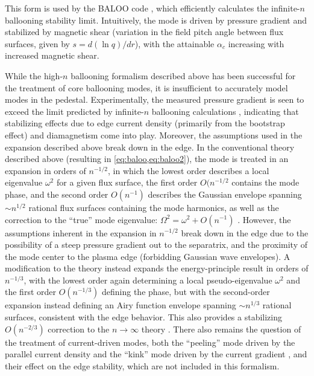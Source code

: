 \noindent This form is used by the BALOO code \cite{Connor1979,Miller1987,Miller1997}, which efficiently calculates the infinite-$n$ ballooning stability limit.  Intuitively, the mode is driven by pressure gradient and stabilized by magnetic shear (variation in the field pitch angle between flux surfaces, given by $s = d(\ln q)/dr$), with the attainable $\alpha_c$ increasing with increased magnetic shear.

While the high-$n$ ballooning formalism described above has been successful for the treatment of core ballooning modes, it is insufficient to accurately model modes in the pedestal.  Experimentally, the measured pressure gradient is seen to exceed the limit predicted by infinite-$n$ ballooning calculations \cite{Groebner1998a,Osborne1998}, indicating that stabilizing effects due to edge current density (primarily from the bootstrap effect) and diamagnetism come into play.  Moreover, the assumptions used in the expansion described above break down in the edge.  In the conventional theory \cite{Connor1978,Connor1979} described above (resulting in \cref{eq:baloo,eq:baloo2}), the mode is treated in an expansion in orders of $n^{-1/2}$, in which the lowest order describes a local eigenvalue $\omega^2$ for a given flux surface, the first order $O(n^{-1/2}$ contains the mode phase, and the second order $O(n^{-1})$ describes the Gaussian envelope spanning $\sim n^{1/2}$ rational flux surfaces containing the mode harmonics, as well as the correction to the ``true'' mode eigenvalue: $\Omega^2 = \omega^2 + O(n^{-1})$ \cite{Connor1998a,Wilson1999}.  However, the assumptions inherent in the expansion in $n^{-1/2}$ break down in the edge due to the possibility of a steep pressure gradient out to the separatrix, and the proximity of the mode center to the plasma edge (forbidding Gaussian wave envelopes).  A modification to the theory \cite{Connor1998a,Wilson1999} instead expands the energy-principle result in orders of $n^{-1/3}$, with the lowest order again determining a local pseudo-eigenvalue $\omega^2$ and the first order $O(n^{-1/3})$ defining the phase, but with the second-order expansion instead defining an Airy function envelope spanning $\sim n^{1/3}$ rational surfaces, consistent with the edge behavior.  This also provides a stabilizing $O(n^{-2/3})$ correction to the $n \rightarrow \infty$ theory \cite{Connor1998a}.  There also remains the question of the treatment of current-driven modes, both the ``peeling'' mode driven by the parallel current density and the ``kink'' mode driven by the current gradient \cite{Wilson2006}, and their effect on the edge stability, which are not included in this formalism.

